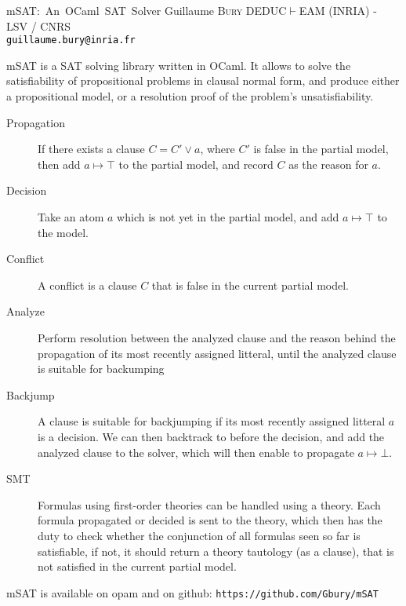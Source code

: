 \documentclass[portrait,a0,final]{a0poster}
\def\msat{\textsf{mSAT}}
\def\opam{\textsf{opam}}
\begin{document}
\sffamily %

\postertitle
{\msat{}:~An~OCaml~SAT~Solver}
{Guillaume \textsc{Bury}}
{DEDUC$\vdash$EAM (INRIA) - LSV / CNRS\\
\Large \textcolor{black}{\texttt{guillaume.bury@inria.fr}}}


\begin{center}

\begin{multicols}{2}

{
  \vspace{0cm} %

  \msat{} is a SAT solving library written in OCaml. It allows to solve the satisfiability
  of propositional problems in clausal normal form, and produce either a propositional model,
  or a resolution proof of the problem's unsatisfiability.
}

{
  \begin{description}
    \item[Propagation] If there exists a clause $C = C' \lor a$, where
      $C'$ is false in the partial model, then add $a \mapsto \top$ to
      the partial model, and record $C$ as the reason for $a$.
    \item[Decision] Take an atom $a$ which is not yet in the partial model,
      and add $a \mapsto \top$ to the model.
    \item[Conflict] A conflict is a clause $C$ that is false in the current partial
      model.
    \item[Analyze] Perform resolution between the analyzed clause and the reason
      behind the propagation of its most recently assigned litteral, until
      the analyzed clause is suitable for backumping
    \item[Backjump] A clause is suitable for backjumping if its most recently
      assigned litteral $a$ is a decision. We can then backtrack to before the
      decision, and add the analyzed clause to the solver, which will then enable
      to propagate $a \mapsto \bot$.
    \item[SMT] Formulas using first-order theories can be handled using a theory.
      Each formula propagated or decided is sent to the theory, which then
      has the duty to check whether the conjunction of all formulas seen so
      far is satisfiable, if not, it should return a theory tautology (as a clause),
      that is not satisfied in the current partial model.
  \end{description}
}

\columnbreak

{

}

{
  
}

{
  
}


\end{multicols}


\Large \msat{} is available on \opam{} and on github: \texttt{https://github.com/Gbury/mSAT}

\end{center}
\end{document}
